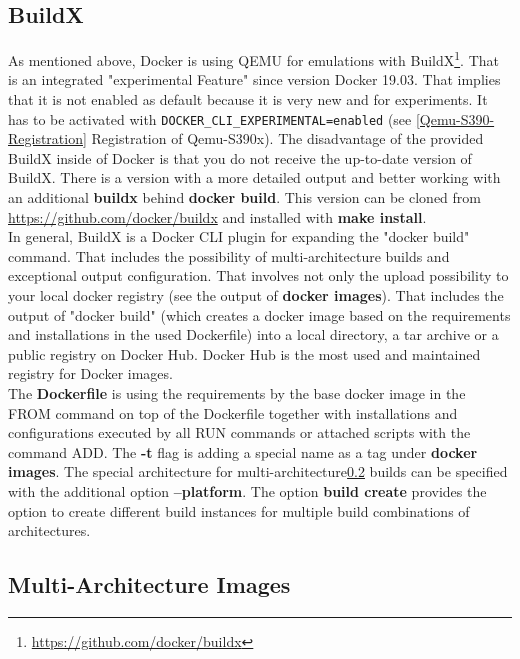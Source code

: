 \subsection{BuildX}\label{BuildX}

As mentioned above, Docker is using QEMU for emulations with BuildX\footnote{\url{https://github.com/docker/buildx}}. That is an integrated "experimental Feature" since version Docker 19.03. That implies that it is not enabled as default because it is very new and for experiments. It has to be activated with \lstinline!DOCKER_CLI_EXPERIMENTAL=enabled! (see \ref{Qemu-S390-Registration} Registration of Qemu-S390x). The disadvantage of the provided BuildX inside of Docker is that you do not receive the up-to-date version of BuildX. There is a version with a more detailed output and better working with an additional \textbf{buildx} behind \textbf{docker build}. This version can be cloned from \url{https://github.com/docker/buildx} and installed with \textbf{make install}. \\
In general, BuildX is a Docker CLI plugin for expanding the "docker build" command. That includes the possibility of multi-architecture builds and exceptional output configuration. That involves not only the upload possibility to your local docker registry (see the output of \textbf{docker images}). That includes the output of "docker build" (which creates a docker image based on the requirements and installations in the used Dockerfile) into a local directory, a tar archive or a public registry on Docker Hub. Docker Hub is the most used and maintained registry for Docker images. \\
The \textbf{Dockerfile} is using the requirements by the base docker image in the FROM command on top of the Dockerfile together with installations and configurations executed by all RUN commands or attached scripts with the command ADD. The \textbf{-t} flag is adding a special name as a tag under \textbf{docker images}.
The special architecture for multi-architecture\ref{MultiArchitectureImages} builds can be specified with the additional option \textbf{--platform}.
The option \textbf{build create} provides the option to create different build instances for multiple build combinations of architectures.

\subsection{Multi-Architecture Images}\label{MultiArchitectureImages}

